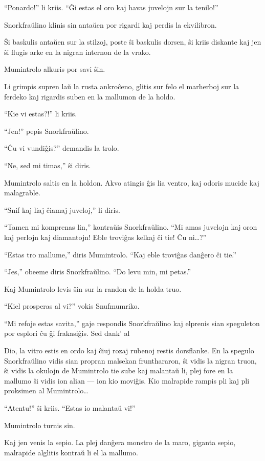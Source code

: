 ``Ponardo!'' li kriis. ``Ĝi estas el oro kaj havas juvelojn sur la tenilo!''

Snorkfraŭlino klinis sin antaŭen por rigardi kaj perdis la ekvilibron.

Ŝi baskulis antaŭen sur la stilzoj, poste ŝi baskulis dorsen, ŝi kriis diskante kaj jen ŝi flugis arke en la nigran internon de la vrako.

Mumintrolo alkuris por savi ŝin.

Li grimpis supren laŭ la rusta ankroĉeno, glitis sur felo el marherboj sur la ferdeko kaj rigardis suben en la mallumon de la holdo.

``Kie vi estas?!'' li kriis.

``Jen!'' pepis Snorkfraŭlino.

``Ĉu vi vundiĝis?'' demandis la trolo.

``Ne, sed mi timas,'' ŝi diris.

Mumintrolo saltis en la holdon. Akvo atingis ĝis lia ventro, kaj odoris mucide kaj malagrable.

``Snif kaj liaj ĉiamaj juveloj,'' li diris.

``Tamen mi komprenas lin,'' kontraŭis Snorkfraŭlino. ``Mi amas juvelojn kaj oron kaj perlojn kaj diamantojn! Eble troviĝas kelkaj ĉi tie! Ĉu ni{\ldots}?''

``Estas tro mallume,'' diris Mumintrolo. ``Kaj eble troviĝas danĝero ĉi tie.''

``Jes,'' obeeme diris Snorkfraŭlino. ``Do levu min, mi petas.''

Kaj Mumintrolo levis ŝin sur la randon de la holda truo.

``Kiel prosperas al vi?'' vokis Snufmumriko.

``Mi refoje estas savita,'' gaje respondis Snorkfraŭlino kaj elprenis sian speguleton por esplori ĉu ĝi frakasiĝis. Sed dank' al

Dio, la vitro estis en ordo kaj ĉiuj rozaj rubenoj restis dorsflanke. En la spegulo Snorkfraŭlino vidis sian propran malsekan frunthararon, ŝi vidis la nigran truon, ŝi vidis la okulojn de Mumintrolo tie sube kaj malantaŭ li, plej fore en la mallumo ŝi vidis ion alian --- ion kio moviĝis. Kio malrapide rampis pli kaj pli proksimen al Mumintrolo{\ldots}

``Atentu!'' ŝi kriis. ``Estas io malantaŭ vi!''

Mumintrolo turnis sin.

Kaj jen venis la sepio. La plej danĝera monstro de la maro, giganta sepio, malrapide alglitis kontraŭ li el la mallumo.

